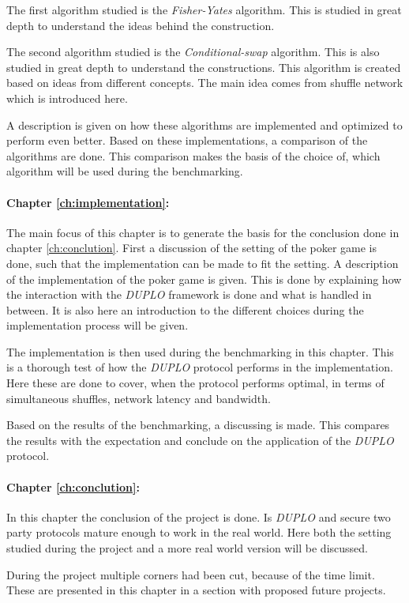 \documentclass[twoside,11pt,openright]{report}
\newcommand{\FY}{\textit{Fisher-Yates} }
\newcommand{\CS}{\textit{Conditional-swap} }
\newcommand{\DUPLO}{\textit{DUPLO} }
\begin{document}
The first algorithm studied is the \FY algorithm. This is studied in great depth to understand the ideas behind the construction.

The second algorithm studied is the \CS algorithm. This is also studied in great depth to understand the constructions. This algorithm is created based on ideas from different concepts. The main idea comes from shuffle network which is introduced here. 

A description is given on how these algorithms are implemented and optimized to perform even better. Based on these implementations, a comparison of the algorithms are done. This comparison makes the basis of the choice of, which algorithm will be used during the benchmarking.


\paragraph{Chapter \ref{ch:implementation}:}
The main focus of this chapter is to generate the basis for the conclusion done in chapter \ref{ch:conclution}. First a discussion of the setting of the poker game is done, such that the implementation can be made to fit the setting. A description of the implementation of the poker game is given. This is done by explaining how the interaction with the \DUPLO framework is done and what is handled in between. It is also here an introduction to the different choices during the implementation process will be given.

The implementation is then used during the benchmarking in this chapter. This is a thorough test of how the \DUPLO protocol performs in the implementation. Here these are done to cover, when the protocol performs optimal, in terms of simultaneous shuffles, network latency and bandwidth.

Based on the results of the benchmarking, a discussing is made. This compares the results with the expectation and conclude on the application of the \DUPLO protocol.


\paragraph{Chapter \ref{ch:conclution}:}
In this chapter the conclusion of the project is done. Is \DUPLO and secure two party protocols mature enough to work in the real world. Here both the setting studied during the project and a more real world version will be discussed. 

During the project multiple corners had been cut, because of the time limit. These are presented in this chapter in a section with proposed future projects.
\end{document}
